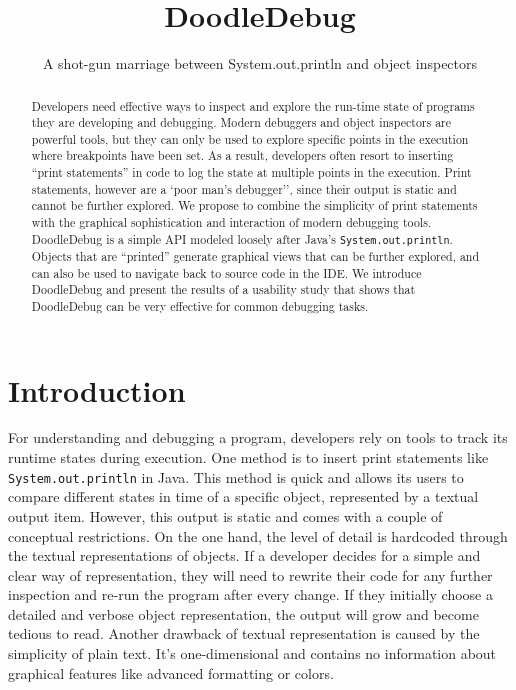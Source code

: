 \documentclass[english]{scrartcl}
\newcommand\meta[1]{\nbc{META}{#1}{purple}}
\newcommand{\DD}{Dood\-le\-De\-bug\xspace}
\newcommand{\println}{\texttt{Sys\-tem.\-out.\-println}\xspace}
\begin{document}
\title{DoodleDebug}
\subtitle{A shot-gun marriage between System.out.println and object inspectors}
\maketitle

\begin{abstract}
\meta{Only copied for now.}
Developers need effective ways to inspect and explore the run-time state of programs they are developing and debugging.  Modern debuggers and object inspectors are powerful tools, but they can only be used to explore specific points in the execution where breakpoints have been set. As a result, developers often resort to inserting ``print statements'' in code to log the state at multiple points in the execution. Print statements, however are a `poor man's debugger'', since their output is static and cannot be further explored.
We propose to combine the simplicity of print statements with the graphical sophistication and interaction of modern debugging tools.
\DD is a simple API modeled loosely after Java's \println. Objects that are ``printed'' generate graphical views that can be further explored, and can also be used to navigate back to source code in the IDE.
We introduce \DD and present the results of a usability study that shows that \DD can be very effective for common debugging tasks.
\end{abstract}

\section{Introduction}

For understanding and debugging a program, developers rely on tools to track its runtime states during execution.
One method is to insert print statements like \println in Java.
This method is quick and allows its users to compare different states in time of a specific object, represented by a textual output item.
However, this output is static and comes with a couple of conceptual restrictions. On the one hand, the level of detail is hardcoded through the textual representations of objects.
If a developer decides for a simple and clear way of representation, they will need to rewrite their code for any further inspection and re-run the program after every change.
If they initially choose a detailed and verbose object representation, the output will grow and become tedious to read.
Another drawback of textual representation is caused by the simplicity of plain text.
It's one-dimensional and contains no information about graphical features like advanced formatting or colors.
\end{document}
